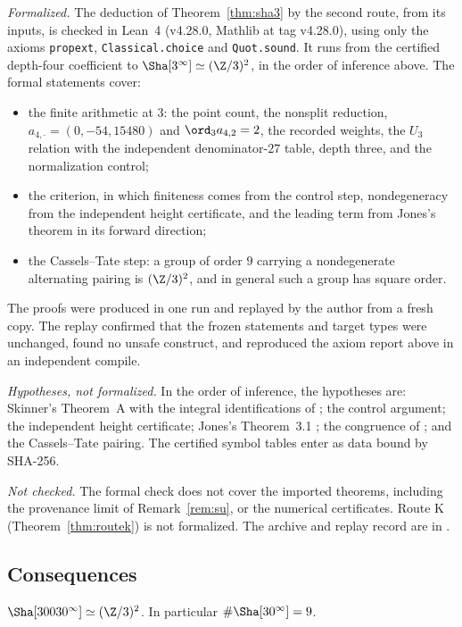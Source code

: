 \begin{remark}\label{rem:a5lean}
\emph{Formalized.} The deduction of Theorem~\ref{thm:sha3} by the second route, from its inputs, is checked in Lean~4 (v4.28.0, Mathlib at tag v4.28.0), using only the axioms \texttt{propext}, \texttt{Classical.choice} and \texttt{Quot.sound}. It runs from the certified depth-four coefficient to $\Sha[3^\infty]\simeq(\Z/3)^2$, in the order of inference above. The formal statements cover:
\begin{itemize}[leftmargin=*]
\item the finite arithmetic at $3$: the point count, the nonsplit reduction, $a_{4,\cdot}=(0,-54,15480)$ and $\ord_3a_{4,2}=2$, the recorded weights, the $U_3$ relation with the independent denominator-$27$ table, depth three, and the normalization control;
\item the criterion, in which finiteness comes from the control step, nondegeneracy from the independent height certificate, and the leading term from Jones's theorem in its forward direction;
\item the Cassels--Tate step: a group of order $9$ carrying a nondegenerate alternating pairing is $(\Z/3)^2$, and in general such a group has square order.
\end{itemize}
The proofs were produced in one run and replayed by the author from a fresh copy. The replay confirmed that the frozen statements and target types were unchanged, found no unsafe construct, and reproduced the axiom report above in an independent compile.

\emph{Hypotheses, not formalized.} In the order of inference, the hypotheses are: Skinner's Theorem~A \cite{skinner} with the integral identifications of \cite{gv}; the control argument; the independent height certificate; Jones's Theorem~3.1 \cite{jones}; the congruence of \cite[Prop.~3.5]{sw}; and the Cassels--Tate pairing. The certified symbol tables enter as data bound by SHA-256.

\emph{Not checked.} The formal check does not cover the imported theorems, including the provenance limit of Remark~\ref{rem:su}, or the numerical certificates. Route K (Theorem~\ref{thm:routek}) is not formalized. The archive and replay record are in .
\end{remark}

\subsection{Consequences}
\begin{corollary}[\cid{S.P}]\label{cor:small}
$\Sha[30030^\infty]\simeq(\Z/3)^2$. In particular $\#\Sha[30^\infty]=9$.
\end{corollary}

